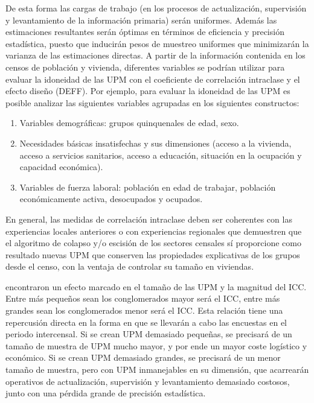 \documentclass[
  12pt,
]{book}
\providecommand{\tightlist}{%
  \setlength{\itemsep}{0pt}\setlength{\parskip}{0pt}}
\begin{document}
De esta forma las cargas de trabajo (en los procesos de actualización, supervisión y levantamiento de la información primaria) serán uniformes. Además las estimaciones resultantes serán óptimas en términos de eficiencia y precisión estadística, puesto que inducirán pesos de muestreo uniformes que minimizarán la varianza de las estimaciones directas. A partir de la información contenida en los censos de población y vivienda, diferentes variables se podrían utilizar para evaluar la idoneidad de las UPM con el coeficiente de correlación intraclase y el efecto diseño (DEFF). Por ejemplo, para evaluar la idoneidad de las UPM es posible analizar las siguientes variables agrupadas en los siguientes constructos:

\begin{enumerate}
\def\labelenumi{\arabic{enumi}.}
\tightlist
\item
  Variables demográficas: grupos quinquenales de edad, sexo.
\item
  Necesidades básicas insatisfechas y sus dimensiones (acceso a la vivienda, acceso a servicios sanitarios, acceso a educación, situación en la ocupación y capacidad económica).
\item
  Variables de fuerza laboral: población en edad de trabajar, población económicamente activa, desocupados y ocupados.
\end{enumerate}

En general, las medidas de correlación intraclase deben ser coherentes con las experiencias locales anteriores o con experiencias regionales que demuestren que el algoritmo de colapso y/o escisión de los sectores censales sí proporcione como resultado nuevas UPM que conserven las propiedades explicativas de los grupos desde el censo, con la ventaja de controlar su tamaño en viviendas.

\citet{hansen1953sample} encontraron un efecto marcado en el tamaño de las UPM y la magnitud del ICC. Entre más pequeños sean los conglomerados mayor será el ICC, entre más grandes sean los conglomerados menor será el ICC. Esta relación tiene una repercusión directa en la forma en que se llevarán a cabo las encuestas en el periodo intercensal. Si se crean UPM demasiado pequeñas, se precisará de un tamaño de muestra de UPM mucho mayor, y por ende un mayor coste logístico y económico. Si se crean UPM demasiado grandes, se precisará de un menor tamaño de muestra, pero con UPM inmanejables en su dimensión, que acarrearán operativos de actualización, supervisión y levantamiento demasiado costosos, junto con una pérdida grande de precisión estadística.
\end{document}
